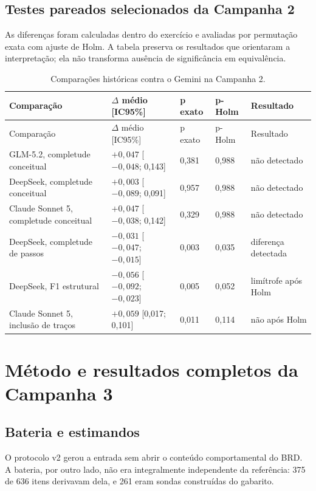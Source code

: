 \documentclass[11pt,a4paper]{article}
\begin{document}
\subsection{Testes pareados selecionados da Campanha 2}

As diferenças foram calculadas dentro do exercício e avaliadas por permutação exata com ajuste de Holm. A tabela preserva os resultados que orientaram a interpretação; ela não transforma ausência de significância em equivalência.

\begingroup
\small
\setlength{\tabcolsep}{3pt}
\begin{longtable}{@{}P{5.3cm}C{3.0cm}C{1.8cm}C{1.8cm}P{2.2cm}@{}}
\caption{Comparações históricas contra o Gemini na Campanha 2.}\label{tab:c2-tests}\\
\toprule
Comparação & $\Delta$ médio [IC95\%] & p exato & p-Holm & Resultado \\
\midrule
\endfirsthead
\toprule
Comparação & $\Delta$ médio [IC95\%] & p exato & p-Holm & Resultado \\
\midrule
\endhead
GLM-5.2, completude conceitual & $+0,047$ [$-0,048$; 0,143] & 0,381 & 0,988 & não detectado \\
DeepSeek, completude conceitual & $+0,003$ [$-0,089$; 0,091] & 0,957 & 0,988 & não detectado \\
Claude Sonnet 5, completude conceitual & $+0,047$ [$-0,038$; 0,142] & 0,329 & 0,988 & não detectado \\
DeepSeek, completude de passos & $-0,031$ [$-0,047$; $-0,015$] & 0,003 & 0,035 & diferença detectada \\
DeepSeek, F1 estrutural & $-0,056$ [$-0,092$; $-0,023$] & 0,005 & 0,052 & limítrofe após Holm \\
Claude Sonnet 5, inclusão de traços & $+0,059$ [0,017; 0,101] & 0,011 & 0,114 & não após Holm \\
\bottomrule
\end{longtable}
\endgroup

\section{Método e resultados completos da Campanha 3}

\subsection{Bateria e estimandos}

O protocolo v2 gerou a entrada sem abrir o conteúdo comportamental do BRD. A bateria, por outro lado, não era integralmente independente da referência: 375 de 636 itens derivavam dela, e 261 eram sondas construídas do gabarito.
\end{document}
